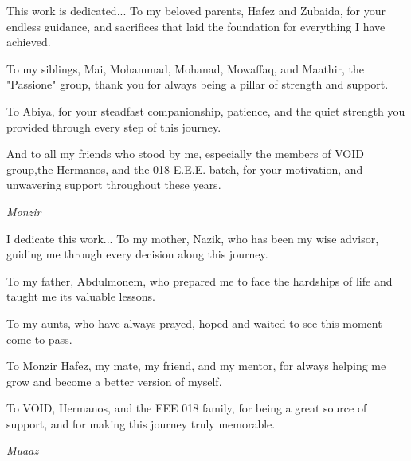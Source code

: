 \begin{center}

\begin{minipage}[t]{0.45\textwidth}
\centering

\vspace{0.5cm}

This work is dedicated...
To my beloved parents, Hafez and Zubaida, for your endless guidance, and sacrifices that laid the foundation for everything I have achieved.

To my siblings, Mai, Mohammad, Mohanad, Mowaffaq, and Maathir, the "Passione" group, thank you for always being a pillar of strength and support.

To Abiya, for your steadfast companionship, patience, and the quiet strength you provided through every step of this journey.

And to all my friends who stood by me, especially the members of VOID group,the Hermanos, and the 018 E.E.E. batch, for your motivation, and unwavering support throughout these years.
\begin{flushright}
    \textit{Monzir}
\end{flushright}

\vspace{1em}

\end{minipage}
\hfill
\begin{minipage}[t]{0.45\textwidth}
\centering



\vspace{0.5cm}

I dedicate this work... To my mother, Nazik, who has been my wise advisor, guiding me through every decision along this journey.

To my father, Abdulmonem, who prepared me to face the hardships of life and taught me its valuable lessons.

To my aunts, who have always prayed, hoped and waited to see this moment come to pass.

To Monzir Hafez, my mate, my friend, and my mentor, for always helping me grow and become a better version of myself.

To VOID, Hermanos, and the EEE 018 family, for being a great source of support, and for making this journey truly memorable.
\begin{flushright}
    \textit{Muaaz}
\end{flushright}

\end{minipage}

\end{center}